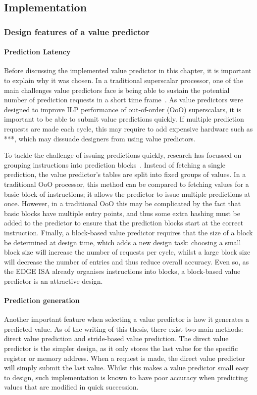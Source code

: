 \subsection{Implementation}

\subsubsection{Design features of a value predictor}
\paragraph*{Prediction Latency} Before discussing the implemented value predictor in this chapter, it is important to explain why it was chosen.
In a traditional superscalar processor, one of the main challenges value predictors face is being able to sustain the potential number of prediction requests in a short time frame~\cite{peraisBeBop2015}.
As value predictors were designed to improve ILP performance of out-of-order (OoO) superscalars, it is important to be able to submit value predictions quickly.
If multiple prediction requests are made each cycle, this may require to add expensive hardware such as ***, which may dissuade designers from using value predictors.

To tackle the challenge of issuing predictions quickly, research has focussed on grouping instructions into prediction blocks~\cite{peraisBeBop2015}.
Instead of fetching a single prediction, the value predictor's tables are split into fixed groups of values.
In a traditional OoO processor, this method can be compared to fetching values for a basic block of instructions; it allows the predictor to issue multiple predictions at once.
However, in a traditional OoO this may be complicated by the fact that basic blocks have multiple entry points, and thus some extra hashing must be added to the predictor to ensure that the prediction blocks start at the correct instruction. %
Finally, a block-based value predictor requires that the size of a block be determined at design time, which adds a new design task: choosing a small block size will increase the number of requests per cycle, whilst a large block size will decrease the number of entries and thus reduce overall accuracy. %
Even so, as the EDGE ISA already organises instructions into blocks, a block-based value predictor is an attractive design.

\paragraph*{Prediction generation} Another important feature when selecting a value predictor is how it generates a predicted value.
As of the writing of this thesis, there exist two main methods: direct value prediction and stride-based value prediction.
The direct value predictor is the simpler design, as it only stores the last value for the specific register or memory address.
When a request is made, the direct value predictor will simply submit the last value.
Whilst this makes a value predictor small easy to design, such implementation is known to have poor accuracy when predicting values that are modified in quick succession.

